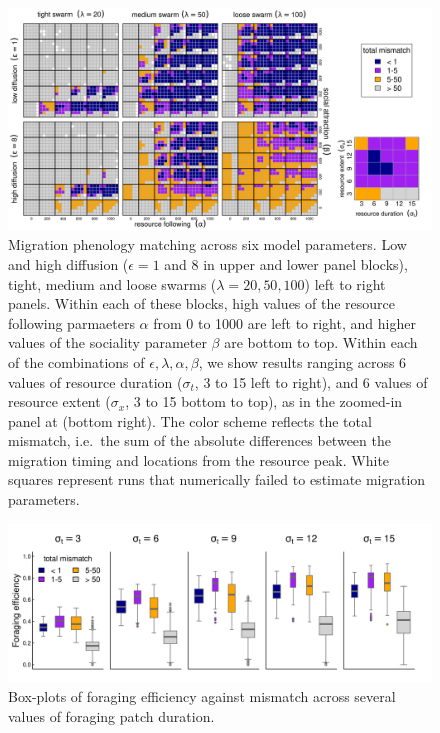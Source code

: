 \documentclass[utf8]{frontiersSCNS} %
\begin{document}
	\begin{figure}
		\includegraphics[width = \textwidth]{figures/StabilityResults.png} 
		\caption{\label{fig_phenologymatching} Migration phenology matching across six model parameters. Low and high diffusion ($\epsilon = 1$ and $8$ in upper and lower panel blocks), tight, medium and loose swarms ($\lambda = 20, 50, 100$) left to right panels. Within each of these blocks, high values of the resource following parmaeters $\alpha$ from 0 to 1000 are left to right, and higher values of the sociality parameter $\beta$ are bottom to top. Within each of the combinations of $\epsilon, \lambda, \alpha, \beta$, we show results ranging across 6 values of resource duration ($\sigma_t$, 3 to 15 left to right), and 6 values of resource extent ($\sigma_x$, 3 to 15 bottom to top), as in the zoomed-in panel at (bottom right). The color scheme reflects the total mismatch, i.e.~the sum of the absolute differences between the migration timing and locations from the resource peak. White squares represent runs that numerically failed to estimate migration parameters.}
	\end{figure}
	
	\begin{figure}
		\includegraphics[width = \textwidth]{figures/ForagingEfficiency.png}
		\caption{\label{fig_boxplotFE} Box-plots of foraging efficiency against mismatch across several values of foraging patch duration.}
	\end{figure}
	
\end{document}
